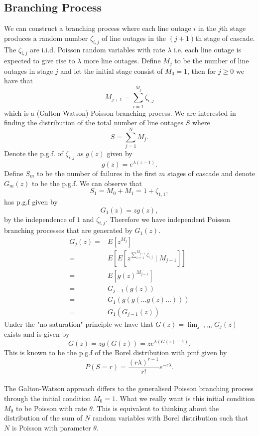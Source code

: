 \documentclass{article}
\begin{document}
\subsection{Branching Process}

We can construct a branching process where each line outage $i$ in the $j$th stage produces a random number $\zeta_{i,j}$ of line outages in the $(j+1)$th stage of cascade. The $\zeta_{i,j}$ are i.i.d. Poisson random variables with rate $\lambda$ i.e. each line outage is expected to give rise to $\lambda$ more line outages. Define $M_j$ to be the number of line outages in stage $j$ and let the initial stage consist of $M_0=1$, then for $j\ge 0$ we have that
\[M_{j+1} = \sum_{i=1}^{M_j} \zeta_{i,j}\]
which is a (Galton-Watson) Poisson branching process. We are interested in finding the distribution of the total number of line outages $S$ where 
\[S = \sum_{j=1}^{N} M_j.\]
Denote the p.g.f. of $\zeta_{i,j}$ as $g(z)$ given by
\[g(z) = e^{\lambda(z-1)}.\]
Define $S_m$ to be the number of failures in the first $m$ stages of cascade and denote $G_m(z)$ to be the p.g.f. We can observe that
\[S_1 = M_0+M_1 = 1+\zeta_{1,1},\]
has p.g.f given by
\[G_1(z) = zg(z),\]	
by the independence of $1$ and $\zeta_{i,j}$. Therefore we have independent Poisson branching processes that are generated by $G_1(z)$. 
\[\begin{aligned} G_j(z) =& E\left[z^{M_j}\right]\\
=& E\left[ E\left[ z^{\sum_{i=1}^{M_{j-1}} \zeta_{i,j}}\mid M_{j-1} \right] \right] \\
=& E\left[ g(z)^{M_{j-1}}\right] \\
=& G_{j-1}(g(z))\\
=& G_1(g(g(\dots g(z)\dots )))\\
=& G_1(G_{j-1}(z))
\end{aligned}\]
Under the "no saturation" principle we have that $G(z) = \lim_{j\to \infty} G_j(z)$ exists and is given by
\[G(z) = zg(G(z)) = ze^{\lambda(G(z)-1)}.\]
This is known to be the p.g.f of the Borel distribution with pmf given by
\[P(S=r) = \frac{(r\lambda)^{r-1}}{r!}e^{-r\lambda}.\] \\

The Galton-Watson approach differs to the generalised Poisson branching process through the initial condition $M_0=1$. What we really want is this initial condition $M_0$ to be Poisson with rate $\theta$. This is equivalent to thinking about the distribution of the sum of $N$ random variables with Borel distribution such that $N$ is Poisson with parameter $\theta$. \\
\end{document}

